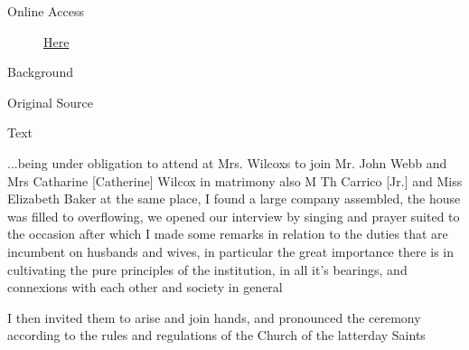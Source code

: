 				\begin{description}
					\item[Online Access] \href{https://www.josephsmithpapers.org/paper-summary/journal-1835-1836/114}{Here}
				\end{description}
				
				\begin{description}
					\item[Background]
				\end{description}
				
				
				\begin{description}
					\item[Original Source]
				\end{description}
				
				
				\begin{description}
					\item[Text]
				\end{description}
				
					...being under obligation to attend at Mrs. Wilcoxs to join Mr. John Webb and Mrs Catharine [Catherine] Wilcox in matrimony also M Th Carrico [Jr.] and Miss Elizabeth Baker at the same place, I found a large company assembled, the house was filled to overflowing, we opened our interview by singing and prayer suited to the occasion after which I made some remarks in relation to the duties that are incumbent on husbands and wives, in particular the great importance there is in cultivating the pure principles of the institution, in all it's bearings, and connexions with each other and society in general
					
					I then invited them to arise and join hands, and pronounced the ceremony according to the rules and regulations of the Church of the latterday Saints
					

